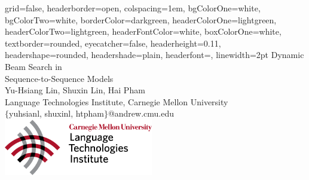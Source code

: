 \documentclass[a0paper,portrait]{baposter}
\begin{document}

\begin{poster}
{
grid=false,
headerborder=open, %
colspacing=1em, %
bgColorOne=white, %
bgColorTwo=white, %
borderColor=darkgreen, %
headerColorOne=lightgreen, %
headerColorTwo=lightgreen, %
headerFontColor=white, %
boxColorOne=white, %
textborder=rounded, %
eyecatcher=false, %
headerheight=0.11\textheight, %
headershape=rounded, %
headershade=plain,
headerfont=\Large\textsf, %
linewidth=2pt %
}
{}
%
%
{
\textsf %
{Dynamic Beam Search in\\Sequence-to-Sequence Models
}
} %
{\sf\vspace{0.5em}\\
Yu-Hsiang Lin, Shuxin Lin, Hai Pham
\vspace{0.1em}\\
\small{Language Technologies Institute, Carnegie Mellon University
\vspace{0.2em}\\
$\{$yuhsianl, shuxinl, htpham$\}$@andrew.cmu.edu}
}
{\includegraphics[width=6.5cm]{LTI-logo.png}} %



\end{poster}
\end{document}
